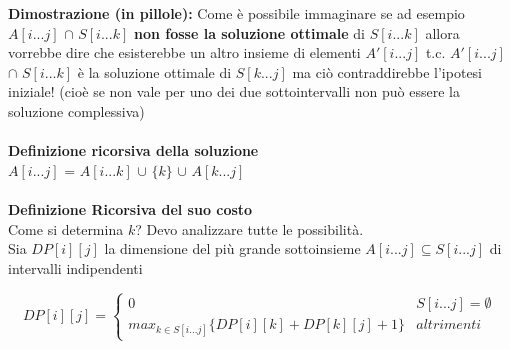 \documentclass[../cheatSheetAlgoritmi.tex]{subfiles}
\begin{document}
\textbf{Dimostrazione (in pillole):} Come è possibile immaginare se ad esempio $A[i...j]$ $\cap$ $S[i...k]$ \textbf{non fosse la soluzione ottimale} di $S[i...k]$ allora vorrebbe dire che esisterebbe un altro insieme di elementi $A'[i...j]$ t.c. $A'[i...j]$ $\cap$ $S[i...k]$ è la soluzione ottimale di $S[k...j]$ ma ciò contraddirebbe l'ipotesi iniziale! (cioè se non vale per uno dei due sottointervalli non può essere la soluzione complessiva)\\\\
\textbf{Definizione ricorsiva della soluzione}\\
$A[i...j]$ = $A[i...k]$ $\cup$ $\{k\}$ $\cup$ $A[k...j]$\\\\
\textbf{Definizione Ricorsiva del suo costo}\\
Come si determina $k$? Devo analizzare tutte le possibilità.\\
Sia $DP[i][j]$ la dimensione del più grande sottoinsieme $A[i...j] \subseteq S[i...j]$ di intervalli indipendenti
\begin{center}
	\begin{equation*}
  		DP[i][j]=\begin{cases}
    		0  & \text{$S[i...j] = \emptyset$}\\
    		max_{k \in S[i...j]}\{DP[i][k] + DP[k][j] + 1\} & \text{$altrimenti$}
  		\end{cases}
	\end{equation*}
\end{center}
\end{document}
